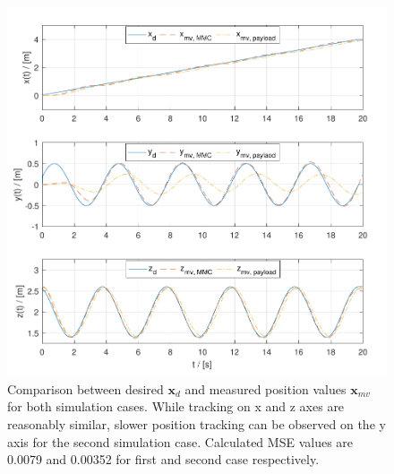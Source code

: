 \begin{figure}[h!]
	\centering
	\includegraphics[width=\columnwidth]{./pictures/both_pos.pdf}
	\caption{Comparison between desired $\textbf{x}_d$ and measured position values $\textbf{x}_{mv}$ for both simulation cases. While tracking on x and z axes are reasonably similar, slower position tracking can be observed on the y axis for the second simulation case. Calculated MSE values are 0.0079 and 0.00352 for first and second case respectively.}
	\label{fig:traj_pos}
\end{figure}

